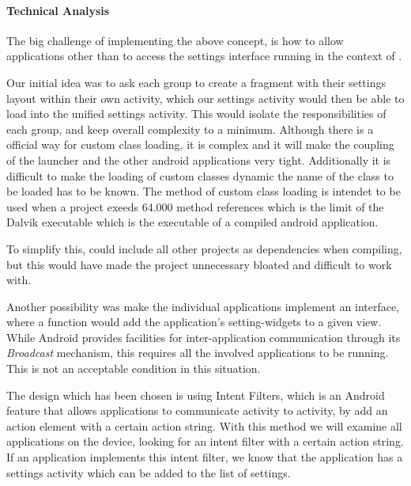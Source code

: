 
\paragraph{Technical Analysis}
The big challenge of implementing the above concept, is how to allow applications other than \launcher to access the settings interface running in the context of \launcher.

Our initial idea was to ask each group to create a fragment with their settings layout within their own activity, which our settings activity would then be able to load into the unified settings activity.
This would isolate the responsibilities of each group, and keep overall complexity to a minimum.
Although there is a official way for custom class loading\cite{customClassLoading}, it is complex and it will make the coupling of the launcher and the other android applications very tight.
Additionally it is difficult to make the loading of custom classes dynamic the name of the class to be loaded has to be known.
The method of custom class loading is intendet to be used when a project exeeds 64.000 method references which is the limit of the Dalvik executable which is the executable of a compiled android application.

To simplify this, \launcher could include all other projects as dependencies when compiling, but this would have made the \launcher project unnecessary bloated and difficult to work with.

Another possibility was make the individual applications implement an interface, where a function would add the application's setting-widgets to a given view.
While Android provides facilities for inter-application communication through its \textit{Broadcast} mechanism\cite{broadcastReceiver}, this requires all the involved applications to be running.
This is not an acceptable condition in this situation. 

The design which has been chosen is using Intent Filters, which is an Android feature that allows applications to communicate activity to activity, by add an action element with a certain action string\cite{intentFilter}.
With this method we will examine all applications on the device, looking for an intent filter with a certain action string.
If an application implements this intent filter, we know that the application has a settings activity which can be added to the list of settings.

